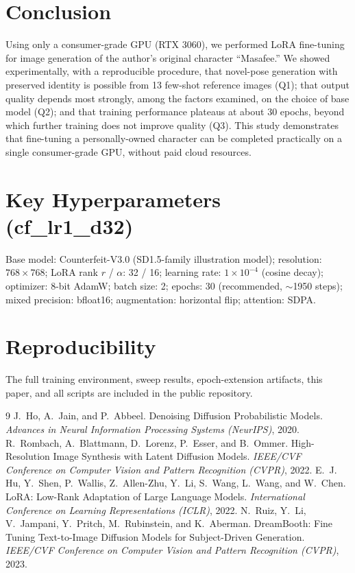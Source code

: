 \documentclass[10pt,twocolumn]{article}
\begin{document}
\section{Conclusion}
Using only a consumer-grade GPU (RTX 3060), we performed LoRA fine-tuning for image generation of the author's original character ``Masafee.'' We showed experimentally, with a reproducible procedure, that novel-pose generation with preserved identity is possible from 13 few-shot reference images (Q1); that output quality depends most strongly, among the factors examined, on the choice of base model (Q2); and that training performance plateaus at about 30 epochs, beyond which further training does not improve quality (Q3). This study demonstrates that fine-tuning a personally-owned character can be completed practically on a single consumer-grade GPU, without paid cloud resources.

\appendix
\section{Key Hyperparameters (cf\_lr1\_d32)}
Base model: Counterfeit-V3.0 (SD1.5-family illustration model); resolution: $768\times768$; LoRA rank $r$ / $\alpha$: 32 / 16; learning rate: $1\!\times\!10^{-4}$ (cosine decay); optimizer: 8-bit AdamW; batch size: 2; epochs: 30 (recommended, $\sim$1950 steps); mixed precision: bfloat16; augmentation: horizontal flip; attention: SDPA.

\section{Reproducibility}
The full training environment, sweep results, epoch-extension artifacts, this paper, and all scripts are included in the public repository.

\begin{thebibliography}{9}
 J.~Ho, A.~Jain, and P.~Abbeel. Denoising Diffusion Probabilistic Models. \textit{Advances in Neural Information Processing Systems (NeurIPS)}, 2020.
 R.~Rombach, A.~Blattmann, D.~Lorenz, P.~Esser, and B.~Ommer. High-Resolution Image Synthesis with Latent Diffusion Models. \textit{IEEE/CVF Conference on Computer Vision and Pattern Recognition (CVPR)}, 2022.
 E.~J. Hu, Y.~Shen, P.~Wallis, Z.~Allen-Zhu, Y.~Li, S.~Wang, L.~Wang, and W.~Chen. LoRA: Low-Rank Adaptation of Large Language Models. \textit{International Conference on Learning Representations (ICLR)}, 2022.
 N.~Ruiz, Y.~Li, V.~Jampani, Y.~Pritch, M.~Rubinstein, and K.~Aberman. DreamBooth: Fine Tuning Text-to-Image Diffusion Models for Subject-Driven Generation. \textit{IEEE/CVF Conference on Computer Vision and Pattern Recognition (CVPR)}, 2023.
\end{thebibliography}
\end{document}
